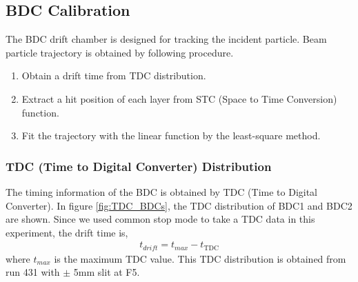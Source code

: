 \subsection{BDC Calibration}
The BDC drift chamber is designed for tracking the incident particle. Beam particle trajectory is obtained by following procedure.

\begin{enumerate}
    \item Obtain a drift time from TDC distribution.
    \item Extract a hit position of each layer from STC (Space to Time Conversion) function.
    \item Fit the trajectory with the linear function by the least-square method.
\end{enumerate}

\subsubsection{TDC (Time to Digital Converter) Distribution}
The timing information of the BDC is obtained by TDC (Time to Digital Converter). In figure \ref{fig:TDC_BDCs}, the TDC distribution of BDC1 and BDC2 are shown. Since we used common stop mode to take a TDC data in this experiment, the drift time is,
\begin{align}
    t_{drift} = t_{max} - t_{\text{TDC}}
\end{align}
where $t_{max}$ is the maximum TDC value. This TDC distribution is obtained from run 431 with $\pm$ 5mm slit at F5. 

